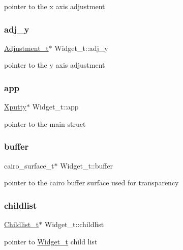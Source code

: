 pointer to the x axis adjustment \mbox{\label{structWidget__t_abde95d3fb49faff5dd852f16810115e7}} 
\subsubsection{\texorpdfstring{adj\+\_\+y}{adj\_y}}
{\footnotesize\ttfamily \hyperlink{structAdjustment__t}{Adjustment\+\_\+t}$\ast$ Widget\+\_\+t\+::adj\+\_\+y}

pointer to the y axis adjustment \mbox{\label{structWidget__t_a06eaa5b134c47983fd965e745cdbaa3b}} 
\subsubsection{\texorpdfstring{app}{app}}
{\footnotesize\ttfamily \hyperlink{structXputty}{Xputty}$\ast$ Widget\+\_\+t\+::app}

pointer to the main struct \mbox{\label{structWidget__t_a84d225e7b261d67daa764b47c8c62107}} 
\subsubsection{\texorpdfstring{buffer}{buffer}}
{\footnotesize\ttfamily cairo\+\_\+surface\+\_\+t$\ast$ Widget\+\_\+t\+::buffer}

pointer to the cairo buffer surface used for transparency \mbox{\label{structWidget__t_ac203ccbc58958a7c205897d4aba197e9}} 
\subsubsection{\texorpdfstring{childlist}{childlist}}
{\footnotesize\ttfamily \hyperlink{structChildlist__t}{Childlist\+\_\+t}$\ast$ Widget\+\_\+t\+::childlist}

pointer to \hyperlink{structWidget__t}{Widget\+\_\+t} child list \mbox{\label{structWidget__t_a26594f6ffabe98fc08f9207150fc9417}} 
